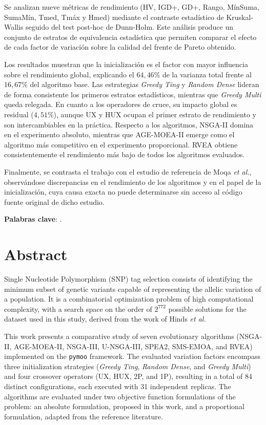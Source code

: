 \documentclass[minitoc, hidelinks, headlogo, framedcover]{tfeEPCC}
\begin{document}
Se analizan nueve métricas de rendimiento (HV, IGD+, GD+, Rango, MínSuma, SumaMín, Tmed, Tmáx y Hmed) mediante el contraste estadístico de Kruskal-Wallis seguido del test post-hoc de Dunn-Holm. Este análisis produce un conjunto de estratos de equivalencia estadística que permiten comparar el efecto de cada factor de variación sobre la calidad del frente de Pareto obtenido.

Los resultados muestran que la inicialización es el factor con mayor influencia sobre el rendimiento global, explicando el $64{,}46\%$ de la varianza total frente al $16{,}67\%$ del algoritmo base. Las estrategias \textit{Greedy Ting} y \textit{Random Dense} lideran de forma consistente los primeros estratos estadísticos, mientras que \textit{Greedy Multi} queda relegada. En cuanto a los operadores de cruce, su impacto global es residual ($4{,}51\%$), aunque UX y HUX ocupan el primer estrato de rendimiento y son intercambiables en la práctica. Respecto a los algoritmos, NSGA-II domina en el experimento absoluto, mientras que AGE-MOEA-II emerge como el algoritmo más competitivo en el experimento proporcional. RVEA obtiene consistentemente el rendimiento más bajo de todos los algoritmos evaluados.

Finalmente, se contrasta el trabajo con el estudio de referencia de Moqa \textit{et al.}, observándose discrepancias en el rendimiento de los algoritmos y en el papel de la inicialización, cuya causa exacta no puede determinarse sin acceso al código fuente original de dicho estudio.

\noindent\textbf{Palabras clave}: \printkeywords.

\chapter*{Abstract}
Single Nucleotide Polymorphism (SNP) tag selection consists of identifying the minimum subset of genetic variants capable of representing the allelic variation of a population. It is a combinatorial optimization problem of high computational complexity, with a search space on the order of $2^{772}$ possible solutions for the dataset used in this study, derived from the work of Hinds \textit{et al.}

This work presents a comparative study of seven evolutionary algorithms (NSGA-II, AGE-MOEA-II, NSGA-III, U-NSGA-III, SPEA2, SMS-EMOA, and RVEA) implemented on the \texttt{pymoo} framework. The evaluated variation factors encompass three initialization strategies (\textit{Greedy Ting}, \textit{Random Dense}, and \textit{Greedy Multi}) and four crossover operators (UX, HUX, 2P, and 1P), resulting in a total of 84 distinct configurations, each executed with 31 independent replicas. The algorithms are evaluated under two objective function formulations of the problem: an absolute formulation, proposed in this work, and a proportional formulation, adapted from the reference literature.
\end{document}
